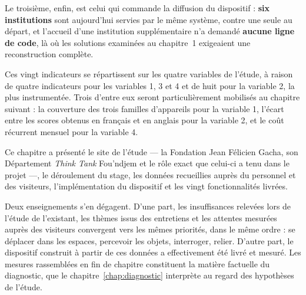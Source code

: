 Le troisième, enfin, est celui qui commande la diffusion du dispositif :
\textbf{six institutions} sont aujourd'hui servies par le même système, contre
une seule au départ, et l'accueil d'une institution supplémentaire n'a demandé
\textbf{aucune ligne de code}, là où les solutions examinées au chapitre~1
exigeaient une reconstruction complète.

Ces vingt indicateurs se répartissent sur les quatre variables de l'étude, à
raison de quatre indicateurs pour les variables 1, 3 et 4 et de huit pour la
variable 2, la plus instrumentée. Trois d'entre eux seront particulièrement
mobilisés au chapitre suivant : la couverture des trois familles d'appareils
pour la variable 1, l'écart entre les scores obtenus en français et en anglais
pour la variable 2, et le coût récurrent mensuel pour la variable 4.

\conclchap

Ce chapitre a présenté le site de l'étude — la Fondation Jean Félicien Gacha,
son Département \emph{Think Tank} Fou'ndjem et le rôle exact que celui-ci a tenu
dans le projet —, le déroulement du stage, les données recueillies auprès du
personnel et des visiteurs, l'implémentation du dispositif et les vingt
fonctionnalités livrées.

Deux enseignements s'en dégagent. D'une part, les insuffisances relevées lors de
l'étude de l'existant, les thèmes issus des entretiens et les attentes mesurées
auprès des visiteurs convergent vers les mêmes priorités, dans le même ordre :
se déplacer dans les espaces, percevoir les objets, interroger, relier. D'autre
part, le dispositif construit à partir de ces données a effectivement été livré
et mesuré. Les mesures rassemblées en fin de chapitre constituent la matière
factuelle du diagnostic, que le chapitre~\ref{chap:diagnostic} interprète au
regard des hypothèses de l'étude.
